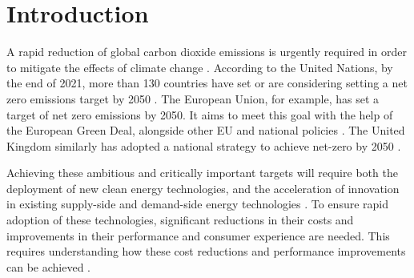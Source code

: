 \documentclass[twoside,twocolumn,9pt]{article}
\begin{document}
\section*{}
\vspace{-1cm}










\section{Introduction}

A rapid reduction of global carbon dioxide emissions is urgently required in order to mitigate the effects of climate change \cite{Forster2019}. According to the United Nations, by the end of 2021, more than 130 countries have set or are considering setting a net zero emissions target by 2050 \cite{un2021climate}. The European Union, for example, has set a target of net zero emissions by 2050. It aims to meet this goal with the help of the European Green Deal, alongside other EU and national policies \cite{eu2020green}. The United Kingdom similarly has adopted a national strategy to achieve net-zero by 2050 \cite{noauthor_ieairena_2023}.

Achieving these ambitious and critically important targets will require both the deployment of new clean energy technologies, and the acceleration of innovation in existing supply-side \cite{sinn2012green} and demand-side energy technologies \cite{rgeVorsatz2009}. To ensure rapid adoption of these technologies, significant reductions in their costs and improvements in their performance and consumer experience are needed. This requires understanding how these cost reductions and performance improvements can be achieved \cite{Stephan2021} \cite{Ziegler2021}.
\end{document}
